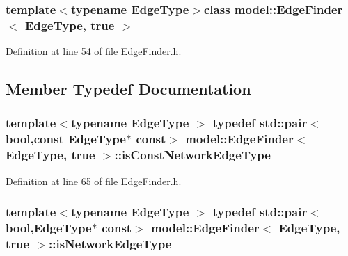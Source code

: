 \subsubsection*{template$<$typename Edge\+Type$>$class model\+::\+Edge\+Finder$<$ Edge\+Type, true $>$}



Definition at line 54 of file Edge\+Finder.\+h.



\subsection{Member Typedef Documentation}
\hypertarget{classmodel_1_1_edge_finder_3_01_edge_type_00_01true_01_4_a284d4a05621d27fa7cfd02dbebeff026}{}
\subsubsection[{is\+Const\+Network\+Edge\+Type}]{\setlength{\rightskip}{0pt plus 5cm}template$<$typename Edge\+Type $>$ typedef std\+::pair$<$bool,const Edge\+Type$\ast$ const$>$ {\bf model\+::\+Edge\+Finder}$<$ Edge\+Type, true $>$\+::{\bf is\+Const\+Network\+Edge\+Type}}\label{classmodel_1_1_edge_finder_3_01_edge_type_00_01true_01_4_a284d4a05621d27fa7cfd02dbebeff026}


Definition at line 65 of file Edge\+Finder.\+h.

\hypertarget{classmodel_1_1_edge_finder_3_01_edge_type_00_01true_01_4_ac9d32373c2d44e63c768e3de6009354c}{}
\subsubsection[{is\+Network\+Edge\+Type}]{\setlength{\rightskip}{0pt plus 5cm}template$<$typename Edge\+Type $>$ typedef std\+::pair$<$bool,Edge\+Type$\ast$ const$>$ {\bf model\+::\+Edge\+Finder}$<$ Edge\+Type, true $>$\+::{\bf is\+Network\+Edge\+Type}}\label{classmodel_1_1_edge_finder_3_01_edge_type_00_01true_01_4_ac9d32373c2d44e63c768e3de6009354c}


